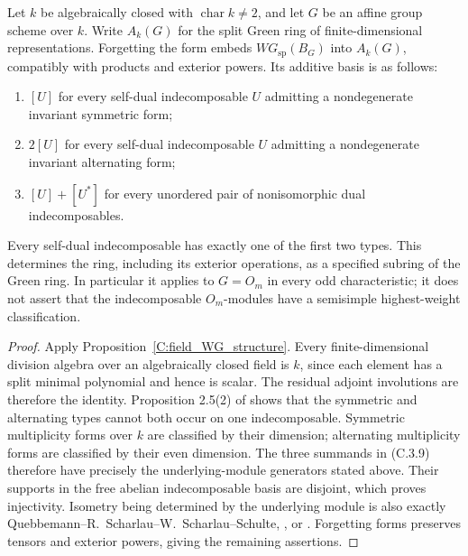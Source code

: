 \begin{proposition}
\label{C:algebraically_closed_WG}
Let $k$ be algebraically closed with $\operatorname{char}k\ne2$, and let
$G$ be an affine group scheme over $k$. Write $A_k(G)$ for the split
Green ring of finite-dimensional representations. Forgetting the form
embeds $WG_{\mathrm{sp}}(B_G)$ into $A_k(G)$, compatibly with products
and exterior powers. Its additive basis is as follows:
\begin{enumerate}
\item $[U]$ for every self-dual indecomposable $U$ admitting a nondegenerate
invariant symmetric form;
\item $2[U]$ for every self-dual indecomposable $U$ admitting a nondegenerate
invariant alternating form;
\item $[U]+[U^*]$ for every unordered pair of nonisomorphic dual
indecomposables.
\end{enumerate}
Every self-dual indecomposable has exactly one of the first two types.
This determines the ring, including its exterior operations, as a specified
subring of the Green ring. In particular it applies to $G=O_m$ in every
odd characteristic; it does not assert that the indecomposable
$O_m$-modules have a semisimple highest-weight classification.
\end{proposition}
\begin{proof}
Apply Proposition~\ref{C:field_WG_structure}. Every finite-dimensional
division algebra over an algebraically closed field is $k$, since each
element has a split minimal polynomial and hence is scalar. The residual
adjoint involutions are therefore the identity. Proposition 2.5(2) of
\cite{C-QSS1979} shows that the symmetric and alternating types cannot
both occur on one indecomposable. Symmetric multiplicity forms over $k$
are classified by their dimension; alternating multiplicity forms are
classified by their even dimension. The three summands in (C.3.9)
therefore have precisely the underlying-module generators stated above.
Their supports in the free abelian indecomposable basis are disjoint,
which proves injectivity. Isometry being determined by the underlying
module is also exactly Quebbemann--R.~Scharlau--W.~Scharlau--Schulte,
\cite[Corollary 3.5, p.97]{C-QSSS1976}, or
\cite[Application 3.4(3), p.274]{C-QSS1979}.
Forgetting forms preserves tensors and exterior powers, giving the
remaining assertions.
\end{proof}

